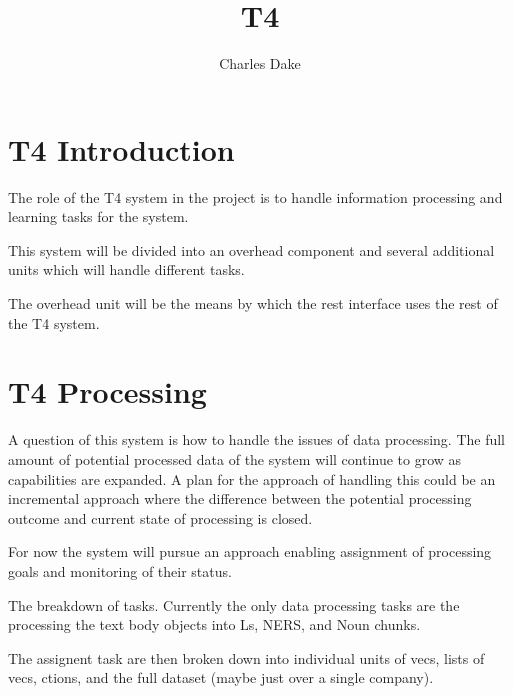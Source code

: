 \documentclass{article}
\title{T4}
\author{Charles Dake}
\begin{document}
\section{T4 Introduction}
The role of the T4 system in the project is to handle information processing and learning tasks for the system.

This system will be divided into an overhead component and several additional units which will handle different tasks.

The overhead unit will be the means by which the rest interface uses the rest of the T4 system.

\section{T4 Processing}
A question of this system is how to handle the issues of data processing. The full amount of potential processed data of the system will continue to grow as capabilities are expanded. A plan for the approach of handling this could be an incremental approach where the difference between the potential processing outcome and current state of processing is closed. 

For now the system will pursue an approach enabling assignment of processing goals and monitoring of their status.

The breakdown of tasks. Currently the only data processing tasks are the processing the text body objects into Ls, NERS, and Noun chunks.

The assignent task are then broken down into individual units of vecs, lists of vecs, ctions, and the full dataset (maybe just over a single company).
\end{document}
